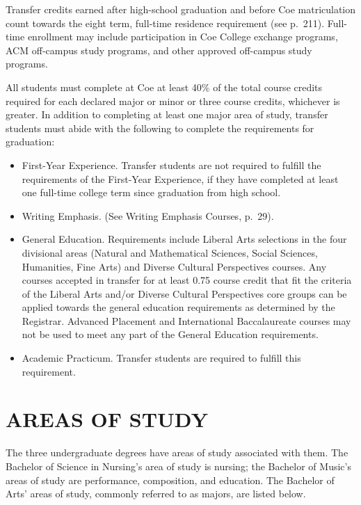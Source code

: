 \documentclass[
  letterpaper,
]{scrbook}
\providecommand{\tightlist}{%
  \setlength{\itemsep}{0pt}\setlength{\parskip}{0pt}}
\begin{document}
Transfer credits earned after high-school graduation and before Coe
matriculation count towards the eight term, full-time residence
requirement (see p.~211). Full-time enrollment may include participation
in Coe College exchange programs, ACM off-campus study programs, and
other approved off-campus study programs.

All students must complete at Coe at least 40\% of the total course
credits required for each declared major or minor or three course
credits, whichever is greater. In addition to completing at least one
major area of study, transfer students must abide with the following to
complete the requirements for graduation:

\begin{itemize}
\tightlist
\item
  First-Year Experience. Transfer students are not required to fulfill
  the requirements of the First-Year Experience, if they have completed
  at least one full-time college term since graduation from high school.
\item
  Writing Emphasis. (See Writing Emphasis Courses, p.~29).
\item
  General Education. Requirements include Liberal Arts selections in the
  four divisional areas (Natural and Mathematical Sciences, Social
  Sciences, Humanities, Fine Arts) and Diverse Cultural Perspectives
  courses. Any courses accepted in transfer for at least 0.75 course
  credit that fit the criteria of the Liberal Arts and/or Diverse
  Cultural Perspectives core groups can be applied towards the general
  education requirements as determined by the Registrar. Advanced
  Placement and International Baccalaureate courses may not be used to
  meet any part of the General Education requirements.
\item
  Academic Practicum. Transfer students are required to fulfill this
  requirement.
\end{itemize}

\chapter{AREAS OF STUDY}\label{sec-areas-of-study}

The three undergraduate degrees have areas of study associated with
them. The Bachelor of Science in Nursing's area of study is nursing; the
Bachelor of Music's areas of study are performance, composition, and
education. The Bachelor of Arts' areas of study, commonly referred to as
majors, are listed below.
\end{document}
